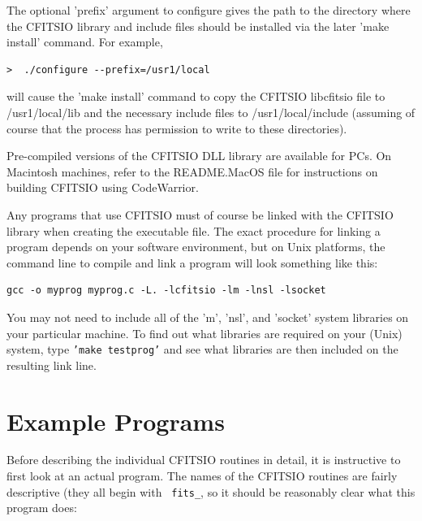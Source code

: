 \documentclass[11pt]{article}
\begin{document}
The optional
'prefix' argument to configure gives the path to the directory where
the CFITSIO library and include files should be installed via the later
'make install' command. For example,

\begin{verbatim}
>  ./configure --prefix=/usr1/local
\end{verbatim}

will cause the 'make install' command to copy the CFITSIO libcfitsio file
to /usr1/local/lib and the necessary include files to /usr1/local/include
(assuming of course that the  process has permission to write to these
directories).

Pre-compiled versions of the CFITSIO DLL library are available for
PCs.  On Macintosh machines, refer to the README.MacOS file for
instructions on building CFITSIO using CodeWarrior.

Any programs that use CFITSIO must of course be linked with the CFITSIO
library when creating the executable file.  The exact procedure for
linking a program depends on your software environment, but on Unix
platforms, the command line to compile and link a program will look
something like this:

\begin{verbatim}
gcc -o myprog myprog.c -L. -lcfitsio -lm -lnsl -lsocket
\end{verbatim}

You may not need to include all of the 'm', 'nsl', and 'socket' system
libraries on your particular machine.  To find out what libraries are
required on your (Unix) system, type {\tt'make testprog'} and see what
libraries are then included on the resulting link line.

\newpage
\section{Example Programs}

Before describing the individual CFITSIO routines in detail, it is
instructive to first look at an actual program.  The names of the
CFITSIO routines are fairly descriptive (they all begin with {\tt
fits\_}, so it should be reasonably clear what this program does:
\end{document}
